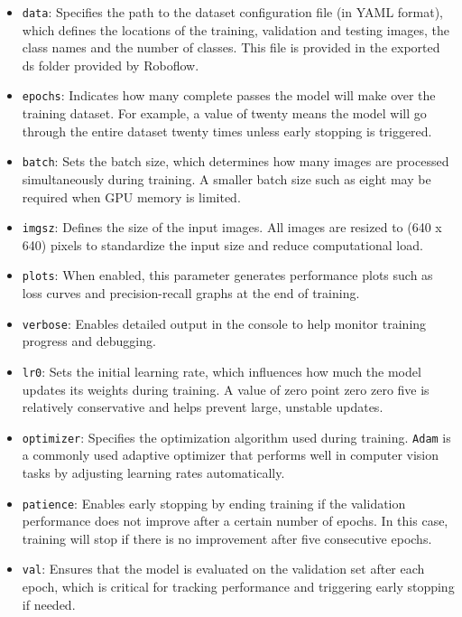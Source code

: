 \begin{itemize}
  \item \texttt{data}: Specifies the path to the dataset configuration file (in YAML format), which defines the locations of the training, validation and testing images, the class names and the number of classes. This file is provided in the exported \gls{ds} folder provided by Roboflow.

  \item \texttt{epochs}: Indicates how many complete passes the model will make over the training dataset. For example, a value of twenty means the model will go through the entire dataset twenty times unless early stopping is triggered.

  \item \texttt{batch}: Sets the batch size, which determines how many images are processed simultaneously during training. A smaller batch size such as eight may be required when GPU memory is limited.

  \item \texttt{imgsz}: Defines the size of the input images. All images are resized to (640 x 640) pixels to standardize the input size and reduce computational load.

  \item \texttt{plots}: When enabled, this parameter generates performance plots such as loss curves and precision-recall graphs at the end of training.

  \item \texttt{verbose}: Enables detailed output in the console to help monitor training progress and debugging.

  \item \texttt{lr0}: Sets the initial learning rate, which influences how much the model updates its weights during training. A value of zero point zero zero five is relatively conservative and helps prevent large, unstable updates.

  \item \texttt{optimizer}: Specifies the optimization algorithm used during training. \texttt{Adam} is a commonly used adaptive optimizer that performs well in computer vision tasks by adjusting learning rates automatically.

  \item \texttt{patience}: Enables early stopping by ending training if the validation performance does not improve after a certain number of epochs. In this case, training will stop if there is no improvement after five consecutive epochs.

  \item \texttt{val}: Ensures that the model is evaluated on the validation set after each epoch, which is critical for tracking performance and triggering early stopping if needed.
\end{itemize}


